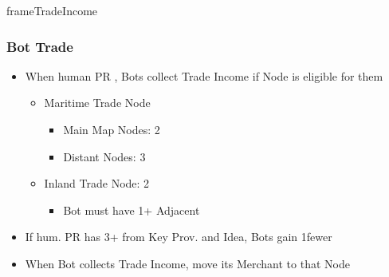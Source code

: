 \documentclass[10pt]{article}
\newlength{\fhTrade} \setlength\fhTrade{40.5\baselineskip}
\begin{document}
\begin{dynamiccontents*}{frameTradeIncome}
\begin{eubox}{\fhTrade}
{	\subsubsection*{Bot Trade }
	\begin{itemize}
		\item When human PR , Bots collect Trade Income if Node is eligible for them
		\begin{itemize}
			\item Maritime Trade Node
			\begin{itemize}
				\item Main Map Nodes: 2\botpower
				\item Distant Nodes: 3\botpower
			\end{itemize}
			\item Inland Trade Node: 2\botpower
			\begin{itemize}
				\item Bot must have 1+ Adjacent \town
			\end{itemize}
		\end{itemize}
		\item If hum. PR has 3+ \tradepower from Key Prov. and  Idea, Bots gain 1\botpower fewer
		\item When Bot collects Trade Income, move its Merchant to that Node	
	\end{itemize}
	}
\end{eubox}\end{dynamiccontents*}
\end{document}
